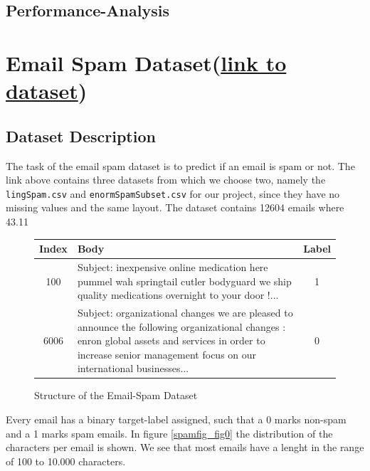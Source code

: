 \documentclass[11pt]{article}
\begin{document}
\subsection{Performance-Analysis}


\section{Email Spam Dataset(\href{https://www.kaggle.com/nitishabharathi/email-spam-dataset}{link to dataset})}


\subsection{Dataset Description}
The task of the email spam dataset is to predict if an email is spam or not. The link above contains three datasets from which we choose two, namely the \texttt{lingSpam.csv} and \texttt{enormSpamSubset.csv} for our project, since they have no missing values and the same layout. The dataset contains 12604 emails where 43.11%

\begin{figure}[h]
  \begin{tabular}{ | c | p{15cm} | c |}
    \hline
    Index & Body & Label \\
    \hline
    100 & 
    Subject: inexpensive online medication here
 pummel wah springtail cutler bodyguard
 we ship quality medications overnight to your door !...
    & 1 \\ \hline
    6006
    &
    Subject: organizational changes
 we are pleased to announce the following organizational changes :
 enron global assets and services
 in order to increase senior management focus on our international businesses... 
    & 0 \\
    \hline
    \end{tabular}
    \caption{Structure of the Email-Spam Dataset}
    \label{tab_spam0}
  \end{figure}
Every email has a binary target-label assigned, such that a 0 marks non-spam and a 1 marks spam emails. In figure \ref{spamfig_fig0} the distribution of the characters per email is shown. We see that most emails have a lenght in the range of 100 to 10.000 characters.
\end{document}
